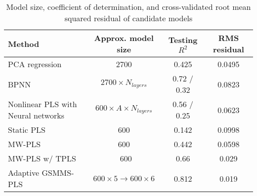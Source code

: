\begin{table}[htpb]
\centering
\caption {Model size, coefficient of determination, and cross-validated root mean squared residual of candidate models}
\footnotesize
    \begin{tabular}{lccc}
    \toprule
       Method                               &    Approx. model size &  Testing $R^2$ & RMS residual \\ \hline
       PCA regression &    2700          & 0.425               & 0.0495     \\
       BPNN    &       $2700\times N_{layers}$    & 0.72 / 0.32 &  0.0823 \\
       Nonlinear PLS with Neural networks & $600 \times A \times N_{layers}$ & 0.56 / 0.25                          & 0.0623      \\
       Static PLS &    600          & 0.142              & 0.0998     \\ \hline
       MW-PLS &    600          & 0.442              & 0.0598     \\
       MW-PLS w/ TPLS&    ~600          & 0.66              & 0.029     \\
       Adaptive GSMMS-PLS &    $600 \times 5\rightarrow 600 \times 6 $          & 0.812              & 0.019     \\
       \bottomrule
    \end{tabular}
    \label{tbl:final_comparison}
\end{table}


